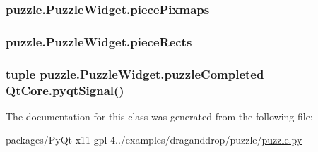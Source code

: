 \subsubsection[{piece\+Pixmaps}]{\setlength{\rightskip}{0pt plus 5cm}puzzle.\+Puzzle\+Widget.\+piece\+Pixmaps}\label{classpuzzle_1_1PuzzleWidget_a20d466b3a5fae45cf8fce8dd72434288}
\hypertarget{classpuzzle_1_1PuzzleWidget_a25c4f743d8ec89241d6a013150888303}{}
\subsubsection[{piece\+Rects}]{\setlength{\rightskip}{0pt plus 5cm}puzzle.\+Puzzle\+Widget.\+piece\+Rects}\label{classpuzzle_1_1PuzzleWidget_a25c4f743d8ec89241d6a013150888303}
\hypertarget{classpuzzle_1_1PuzzleWidget_acffd09b27b0e7eeb1b5b27bb0f9616de}{}
\subsubsection[{puzzle\+Completed}]{\setlength{\rightskip}{0pt plus 5cm}tuple puzzle.\+Puzzle\+Widget.\+puzzle\+Completed = Qt\+Core.\+pyqt\+Signal()\hspace{0.3cm}{\ttfamily [static]}}\label{classpuzzle_1_1PuzzleWidget_acffd09b27b0e7eeb1b5b27bb0f9616de}


The documentation for this class was generated from the following file\+:\begin{DoxyCompactItemize}
\item 
packages/\+Py\+Qt-\/x11-\/gpl-\/4../examples/draganddrop/puzzle/\hyperlink{draganddrop_2puzzle_2puzzle_8py}{puzzle.\+py}\end{DoxyCompactItemize}
